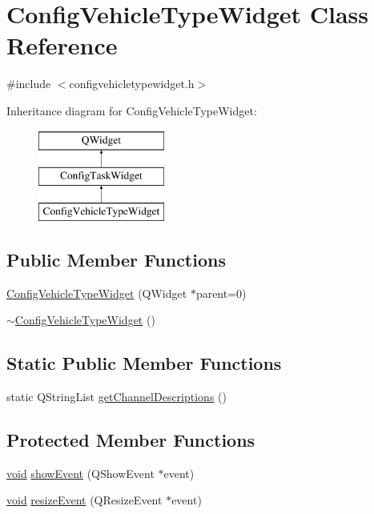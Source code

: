\hypertarget{class_config_vehicle_type_widget}{\section{Config\-Vehicle\-Type\-Widget Class Reference}
\label{class_config_vehicle_type_widget}
}


{\ttfamily \#include $<$configvehicletypewidget.\-h$>$}

Inheritance diagram for Config\-Vehicle\-Type\-Widget\-:\begin{figure}[H]
\begin{center}
\leavevmode
\includegraphics[height=3.000000cm]{class_config_vehicle_type_widget}
\end{center}
\end{figure}
\subsection*{Public Member Functions}
\begin{DoxyCompactItemize}
\item 
\hyperlink{group___config_plugin_ga073c5b646c2487874d095f97989f4358}{Config\-Vehicle\-Type\-Widget} (Q\-Widget $\ast$parent=0)
\item 
\hyperlink{group___config_plugin_ga7edb0b23fc32af7728baa08038a79202}{$\sim$\-Config\-Vehicle\-Type\-Widget} ()
\end{DoxyCompactItemize}
\subsection*{Static Public Member Functions}
\begin{DoxyCompactItemize}
\item 
static Q\-String\-List \hyperlink{group___config_plugin_ga65301666bc0f14e94e8f718af4e6cc08}{get\-Channel\-Descriptions} ()
\end{DoxyCompactItemize}
\subsection*{Protected Member Functions}
\begin{DoxyCompactItemize}
\item 
\hyperlink{group___u_a_v_objects_plugin_ga444cf2ff3f0ecbe028adce838d373f5c}{void} \hyperlink{group___config_plugin_gab830a9c8fbb8c286953a005382701f94}{show\-Event} (Q\-Show\-Event $\ast$event)
\item 
\hyperlink{group___u_a_v_objects_plugin_ga444cf2ff3f0ecbe028adce838d373f5c}{void} \hyperlink{group___config_plugin_gaa35315a56ddec502ecc1c683b51364d8}{resize\-Event} (Q\-Resize\-Event $\ast$event)
\end{DoxyCompactItemize}
